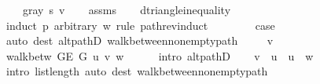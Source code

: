 \begin{isabellebody}
\ \ \ \ {\isachardoublequoteopen}gray\ s\ v{\isachardoublequoteclose}\isanewline
%
\isadelimproof
\ \ %
\endisadelimproof
%
\isatagproof
{}\isamarkupfalse%
\ assms\isanewline
\ \ \isamarkupfalse%
\ d{\isacharunderscore}{\kern0pt}triangle{\isacharunderscore}{\kern0pt}inequality\isanewline
{}\isamarkupfalse%
\ {\isacharparenleft}{\kern0pt}induct\ p\ arbitrary{\isacharcolon}{\kern0pt}\ w\ rule{\isacharcolon}{\kern0pt}\ path{\isacharunderscore}{\kern0pt}rev{\isacharunderscore}{\kern0pt}induct{\isacharparenright}{\kern0pt}\isanewline
\ \ \isamarkupfalse%
\ {}\isanewline
\ \ \isamarkupfalse%
\ {\isacharquery}{\kern0pt}case\isanewline
\ \ \ \ \isamarkupfalse%
\ {\isacharparenleft}{\kern0pt}auto\ dest{\isacharcolon}{\kern0pt}\ alt{\isacharunderscore}{\kern0pt}pathD{\isacharparenleft}{\kern0pt}{}{\isacharparenright}{\kern0pt}\ walk{\isacharunderscore}{\kern0pt}between{\isacharunderscore}{\kern0pt}nonempty{\isacharunderscore}{\kern0pt}path{\isacharparenleft}{\kern0pt}{}{\isacharparenright}{\kern0pt}{\isacharparenright}{\kern0pt}\isanewline
{}\isamarkupfalse%
\isanewline
\ \ \isamarkupfalse%
\ {\isacharparenleft}{\kern0pt}{}\ v{\isacharparenright}{\kern0pt}\isanewline
\ \ \isamarkupfalse%
\ {\isachardoublequoteopen}walk{\isacharunderscore}{\kern0pt}betw\ {\isacharparenleft}{\kern0pt}G{\isachardot}{\kern0pt}E\ G{\isacharparenright}{\kern0pt}\ u\ {\isacharbrackleft}{\kern0pt}v{\isacharbrackright}{\kern0pt}\ w{\isachardoublequoteclose}\isanewline
\ \ \ \ \isamarkupfalse%
\ {\isacharparenleft}{\kern0pt}intro\ alt{\isacharunderscore}{\kern0pt}pathD{\isacharparenleft}{\kern0pt}{}{\isacharparenright}{\kern0pt}{\isacharparenright}{\kern0pt}\isanewline
\ \ \isamarkupfalse%
\ {\isachardoublequoteopen}{\isacharbrackleft}{\kern0pt}v{\isacharbrackright}{\kern0pt}\ {\isacharequal}{\kern0pt}\ {\isacharbrackleft}{\kern0pt}u{\isacharbrackright}{\kern0pt}\ {\isasymand}\ u\ {\isacharequal}{\kern0pt}\ w{\isachardoublequoteclose}\isanewline
\ \ \ \ \isamarkupfalse%
\ {\isacharparenleft}{\kern0pt}intro\ list{\isacharunderscore}{\kern0pt}length{\isacharunderscore}{\kern0pt}{}{\isacharparenright}{\kern0pt}\ {\isacharparenleft}{\kern0pt}auto\ dest{\isacharcolon}{\kern0pt}\ walk{\isacharunderscore}{\kern0pt}between{\isacharunderscore}{\kern0pt}nonempty{\isacharunderscore}{\kern0pt}path{\isacharparenleft}{\kern0pt}{}{\isacharminus}{\kern0pt}{}{\isacharparenright}{\kern0pt}{\isacharparenright}{\kern0pt}\isanewline

\end{isabellebody}
